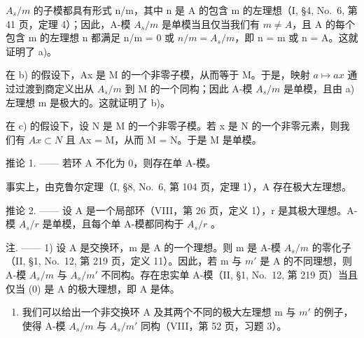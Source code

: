 \(A_{s}/m\) 的子模都具有形式 n/m，其中 n 是 A 的包含 m 的左理想（I, §4, No.~6, 第 41 页，定理 4）；因此，A-模 \(A_{s}/m\) 是单模当且仅当我们有 \(m \neq A\)，且 A 的每个包含 m 的左理想 n 都满足 n/m = 0 或 \(n/m = A_{s}/m\)，即 n = m 或 n = A。这就证明了 a)。

在 b) 的假设下，Ax 是 M 的一个非零子模，从而等于 M。于是，映射 \(a \mapsto ax\) 通过过渡到商定义出从 \(A_{s}/m\) 到 M 的一个同构；因此 A-模 \(A_{s}/m\) 是单模，且由 a) 左理想 m 是极大的。这就证明了 b)。

在 c) 的假设下，设 N 是 M 的一个非零子模。若 x 是 N 的一个非零元素，则我们有 \(Ax \subset N\) 且 Ax = M，从而 M = N。于是 M 是单模。

推论 1. —— 若环 A 不化为 0，则存在单 A-模。

事实上，由克鲁尔定理（I, §8, No.~6, 第 104 页，定理 1），A 存在极大左理想。

推论 2. —— 设 A 是一个局部环（VIII，第 26 页，定义 1），r 是其极大理想。A-模 \(A_{s}/r\) 是单模，且每个单 A-模都同构于 \(A_{s}/r\) 。

注. —— 1) 设 A 是交换环，m 是 A 的一个理想。则 m 是 A-模 \(A_{s}/m\) 的零化子（II, §1, No.~12, 第 219 页，定义 11）。因此，若 m 与 \(m'\) 是 A 的不同理想，则 A-模 \(A_{s}/m\) 与 \(A_{s}/m'\) 不同构。存在忠实单 A-模（II, §1, No.~12, 第 219 页）当且仅当 (0) 是 A 的极大理想，即 A 是体。

\begin{enumerate}
\def\labelenumi{\arabic{enumi})}
\setcounter{enumi}{1}
\tightlist
\item
  我们可以给出一个非交换环 A 及其两个不同的极大左理想 m 与 \(m'\) 的例子，使得 A-模 \(A_{s}/m\) 与 \(A_{s}/m'\) 同构（VIII，第 52 页，习题 3）。
\end{enumerate}

